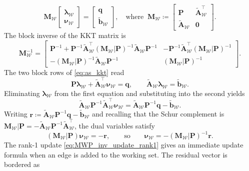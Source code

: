 \documentclass[a4paper,12pt,openany]{book}
\newcommand{\A}{\mathbf{A}}
\newcommand{\M}{\mathbf{M}}
\renewcommand{\P}{\mathbf{P}}
\renewcommand{\b}{\mathbf{b}}
\newcommand{\q}{\mathbf{q}}
\newcommand{\lh}{\boldsymbol{\lambda}}
\begin{document}
\begin{appendices}
\begin{equation}
	\M_\mathcal{W}
	\begin{bmatrix}
		\lh_\mathcal{W} \\
		\boldsymbol{\nu}_\mathcal{W}
	\end{bmatrix}
	=
	\begin{bmatrix}
		\q \\
		\tilde{\b}_\mathcal{W}
	\end{bmatrix},\quad
	\text{where }\ 
	\M_\mathcal{W}\coloneqq\begin{bmatrix}
		\P & \tilde{\A}_\mathcal{W}^\top \\
		\tilde{\A}_\mathcal{W} & \mathbf{0}
	\end{bmatrix}.
\end{equation}
The block inverse of the KKT matrix is
\begin{equation}
	\label{eq:MW_full_inv}
	\M_\mathcal{W}^{-1}
	=
	\begin{bmatrix}
		\P^{-1}+\P^{-1}\tilde{\A}_\mathcal{W}^\top(\M_\mathcal{W}|\P)^{-1}\tilde{\A}_\mathcal{W}\P^{-1} & -\P^{-1}\tilde{\A}_\mathcal{W}^\top(\M_\mathcal{W}|\P)^{-1} \\[6pt]
		-(\M_\mathcal{W}|\P)^{-1}\tilde{\A}_\mathcal{W}\P^{-1} & (\M_\mathcal{W}|\P)^{-1}
	\end{bmatrix}.
\end{equation}
The two block rows of \eqref{eq:as_kkt} read
\begin{equation}
	\label{eq:kkt_primal_block}
	\P\lh_\mathcal{W}+\tilde{\A}_\mathcal{W}^\top\boldsymbol{\nu}_\mathcal{W}=\q,
	\qquad
	\tilde{\A}_\mathcal{W}\lh_\mathcal{W}=\tilde{\b}_\mathcal{W}.
\end{equation}
Eliminating $\lh_\mathcal{W}$ from the first equation and substituting into the second yields
\begin{equation}
	\tilde{\A}_\mathcal{W}\P^{-1}\tilde{\A}_\mathcal{W}^\top\boldsymbol{\nu}_\mathcal{W}
	=
	\tilde{\A}_\mathcal{W}\P^{-1}\q-\tilde{\b}_\mathcal{W}.
\end{equation}
Writing $\mathbf{r}\coloneqq\tilde{\A}_\mathcal{W}\P^{-1}\q - \tilde{\b}_\mathcal{W}$ and recalling that the Schur complement is $\M_\mathcal{W}|\P=-\tilde{\A}_\mathcal{W}\P^{-1}\tilde{\A}_\mathcal{W}^\top$, the dual variables satisfy
\begin{equation}
	\label{eq:dual_schur_system}
	(\M_\mathcal{W}|\P)\boldsymbol{\nu}_\mathcal{W}=-\mathbf{r},
	\qquad\text{so}\qquad
	\boldsymbol{\nu}_\mathcal{W}=-(\M_\mathcal{W}|\P)^{-1}\mathbf{r}.
\end{equation}
The rank-1 update \eqref{eq:MWP_inv_update_rank1} gives an immediate update formula when an edge is added to the working set. The residual vector is bordered as

\end{appendices}
\end{document}
